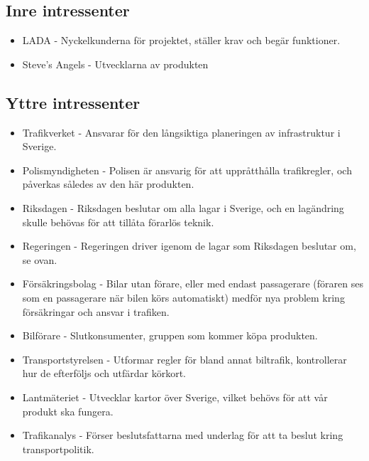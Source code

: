 \documentclass[10pt]{article}
\begin{document}
\subsection{Inre intressenter}
\noindent
\begin{itemize}
	\setlength\itemsep{0.1em}
	\item LADA - Nyckelkunderna för projektet, ställer krav och begär funktioner.
	\item Steve’s Angels - Utvecklarna av produkten
\end{itemize}
\subsection{Yttre intressenter}
\noindent
\begin{itemize}
	\setlength\itemsep{0.1em}
	\item Trafikverket - Ansvarar för den långsiktiga planeringen av infrastruktur i Sverige.
	\item Polismyndigheten - Polisen är ansvarig för att uppråtthålla trafikregler, och påverkas således av den här produkten.
	\item Riksdagen - Riksdagen beslutar om alla lagar i Sverige, och en lagändring skulle behövas för att tillåta förarlös teknik.
	\item Regeringen - Regeringen driver igenom de lagar som Riksdagen beslutar om, se ovan.
	\item Försäkringsbolag - Bilar utan förare, eller med endast passagerare (föraren ses som en passagerare när bilen körs automatiskt) medför nya problem kring försäkringar och ansvar i trafiken.
	\item Bilförare - Slutkonsumenter, gruppen som kommer köpa produkten.
	\item Transportstyrelsen - Utformar regler för bland annat biltrafik, kontrollerar hur de efterföljs och utfärdar körkort.
	\item Lantmäteriet - Utvecklar kartor över Sverige, vilket behövs för att vår produkt ska fungera.
	\item Trafikanalys - Förser beslutsfattarna med underlag för att ta beslut kring transportpolitik.
\end{itemize}
\end{document}

